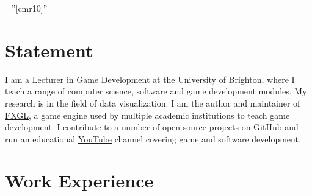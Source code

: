 \documentclass[a4paper,11pt]{article} %
\begin{document}
\pagestyle{empty} %

\font\fb=''[cmr10]'' %


\par{\bigskip\par} %

\section{Statement}

I am a Lecturer in Game Development at the University of Brighton, where I teach a range of computer science, software and game development modules.
My research is in the field of data visualization.
I am the author and maintainer of \href{https://github.com/AlmasB/FXGL}{FXGL}, a game engine used by multiple academic institutions to teach game development.
I contribute to a number of open-source projects on \href{https://github.com/AlmasB}{GitHub} and run an educational \href{https://www.youtube.com/almasb0/videos}{YouTube} channel covering game and software development.


\section{Work Experience}
\end{document}
